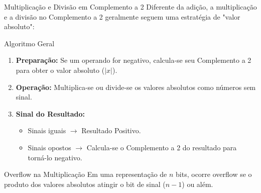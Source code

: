 \begin{frame}{Multiplicação e Divisão em Complemento a 2}
    Diferente da adição, a multiplicação e a divisão no Complemento a 2 geralmente seguem uma estratégia de "valor absoluto":

    \begin{block}{Algoritmo Geral}
        \begin{enumerate}
            \item \textbf{Preparação:} Se um operando for negativo, calcula-se seu Complemento a 2 para obter o valor absoluto ($|x|$).
            \item \textbf{Operação:} Multiplica-se ou divide-se os valores absolutos como números sem sinal.
            \item \textbf{Sinal do Resultado:}
                  \begin{itemize}
                      \item Sinais iguais $\rightarrow$ Resultado Positivo.
                      \item Sinais opostos $\rightarrow$ Calcula-se o Complemento a 2 do resultado para torná-lo negativo.
                  \end{itemize}
        \end{enumerate}
    \end{block}

    \begin{alertblock}{Overflow na Multiplicação}
        Em uma representação de $n$ bits, ocorre overflow se o produto dos valores absolutos atingir o bit de sinal ($n-1$) ou além.
    \end{alertblock}
\end{frame}

